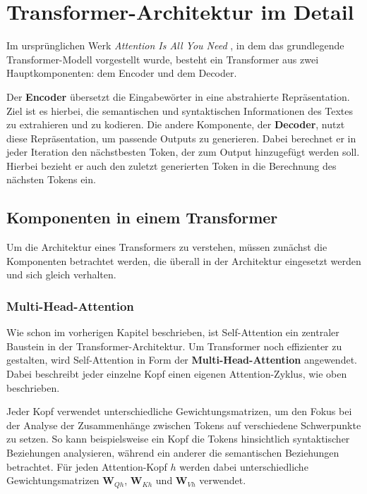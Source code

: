 \chapter{Transformer-Architektur im Detail}

Im ursprünglichen Werk \textit{Attention Is All You Need} , in dem das grundlegende Transformer-Modell vorgestellt wurde, besteht ein Transformer aus zwei Hauptkomponenten: dem Encoder und dem Decoder.

Der \textbf{Encoder} übersetzt die Eingabewörter in eine abstrahierte Repräsentation.  
Ziel ist es hierbei, die semantischen und syntaktischen Informationen des Textes zu extrahieren und zu kodieren.  
Die andere Komponente, der \textbf{Decoder}, nutzt diese Repräsentation, um passende Outputs zu generieren. Dabei berechnet er in jeder Iteration den nächstbesten Token, der zum Output hinzugefügt werden soll. Hierbei bezieht er auch den zuletzt generierten Token in die Berechnung des nächsten Tokens ein.

\section{Komponenten in einem Transformer}

Um die Architektur eines Transformers zu verstehen, müssen zunächst die Komponenten betrachtet werden, die überall in der Architektur eingesetzt werden und sich gleich verhalten.

\subsection{Multi-Head-Attention}

Wie schon im vorherigen Kapitel beschrieben, ist Self-Attention ein zentraler Baustein in der Transformer-Architektur.  
Um Transformer noch effizienter zu gestalten, wird Self-Attention in Form der \textbf{Multi-Head-Attention} angewendet. Dabei beschreibt jeder einzelne Kopf einen eigenen Attention-Zyklus, wie oben beschrieben.

Jeder Kopf verwendet unterschiedliche Gewichtungsmatrizen, um den Fokus bei der Analyse der Zusammenhänge zwischen Tokens auf verschiedene Schwerpunkte zu setzen.  
So kann beispielsweise ein Kopf die Tokens hinsichtlich syntaktischer Beziehungen analysieren, während ein anderer die semantischen Beziehungen betrachtet.  
Für jeden Attention-Kopf \( h \) werden dabei unterschiedliche Gewichtungsmatrizen \( \mathbf{W}_{Qh} \), \( \mathbf{W}_{Kh} \) und \( \mathbf{W}_{Vh} \) verwendet.


